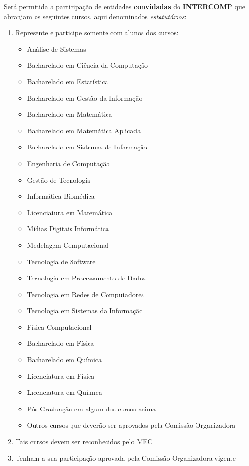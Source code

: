 \begin{article}
	\begin{xparagraph}
		Será permitida a participação de entidades \textbf{convidadas} do \textbf{INTERCOMP} que abranjam os seguintes cursos, aqui denominados \textit{estatutários}:
		\begin{enumerate}[noitemsep,leftmargin=2\parindent]
			\item Represente e participe somente com alunos dos cursos:
			\begin{itemize}[noitemsep]
				\item Análise de Sistemas
				\item Bacharelado em Ciência da Computação
				\item Bacharelado em Estatística
				\item Bacharelado em Gestão da Informação
				\item Bacharelado em Matemática
				\item Bacharelado em Matemática Aplicada
				\item Bacharelado em Sistemas de Informação
				\item Engenharia de Computação
				\item Gestão de Tecnologia
				\item Informática Biomédica
				\item Licenciatura em Matemática
				\item Mídias Digitais Informática
				\item Modelagem Computacional
				\item Tecnologia de Software
				\item Tecnologia em Processamento de Dados
				\item Tecnologia em Redes de Computadores
				\item Tecnologia em Sistemas da Informação
				\item Física Computacional
				\item Bacharelado em Física
				\item Bacharelado em Química
				\item Licenciatura em Física
				\item Licenciatura em Química
				\item Pós-Graduação em algum dos cursos acima
				\item Outros cursos que deverão ser aprovados pela Comissão Organizadora
			\end{itemize}

			\item Tais cursos devem ser reconhecidos pelo MEC
			\item Tenham a sua participação aprovada pela Comissão Organizadora vigente
		\end{enumerate}
	\end{xparagraph}


\end{article}
